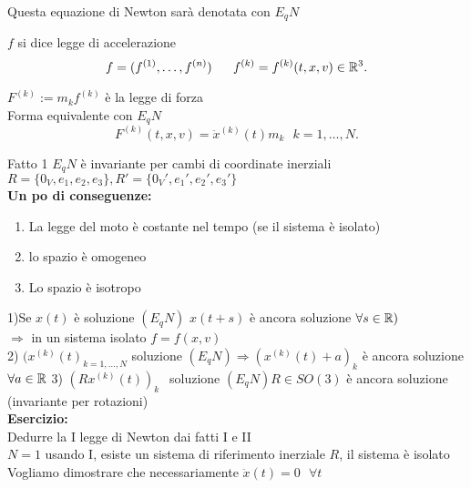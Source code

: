 \documentclass{article}
\begin{document}
Questa equazione di Newton sarà denotata con $E_q N$ 
\begin{defi}
	$f$ si dice legge di accelerazione\\
 \[
	 f = (f^{(1)},\ldots, f^{(n)}) \ \ \ \ \ f^{(k)} = f^{(k)}(t,x,v)\in\R^3
.\] 
\end{defi}
\begin{defi}
	$F^{(k)}:=m_k f^{(k)}$ è la legge di forza\\
	Forma equivalente con $E_qN$\\
	 \[
		 F^{(k)}(t,x,v) = \ddot x^{(k)}(t)m_k \ \ \ k = 1, \ldots, N
	.\] 
\end{defi}
Fatto 1 $E_qN$ è invariante per cambi di coordinate inerziali
$R = \{0_V, e_1,e_2,e_3\}, R' = \{0_V', e_1',e_2',e_3'\}$\\
\textbf{Un po di conseguenze:}
\begin{enumerate}
	\item La legge del moto è costante nel tempo (se il sistema è isolato)
	\item lo spazio è omogeneo
	\item Lo spazio è isotropo 
\end{enumerate}
1)Se $x(t)$ è soluzione $(E_qN)$  $x(t + s)$ è ancora soluzione $\forall s\in \mathbb{R})$\\
 $ \Rightarrow$ in un sistema isolato $f = f(x,v)$ \\
 2) $(x^{(k)}(t)_{k = 1,\ldots, N}$ soluzione  $(E_qN) \Rightarrow (x^{(k)}(t) + a)_k $ è ancora soluzione $\forall a\in \mathbb{R}$
 3) $(Rx^{(k)}(t))_k \ \ $ soluzione $(E_qN) R\in SO(3)$ è ancora soluzione (invariante per rotazioni) \\
 \textbf{Esercizio:}\\
Dedurre la I legge di Newton dai fatti I e II\\
$N = 1$ usando I, esiste un sistema di riferimento inerziale  $R$, il sistema è isolato\\
 Vogliamo dimostrare che necessariamente  $\ddot x(t) = 0\ \ \ \forall t$\\


\maketitle
	\newpage
\end{document}
